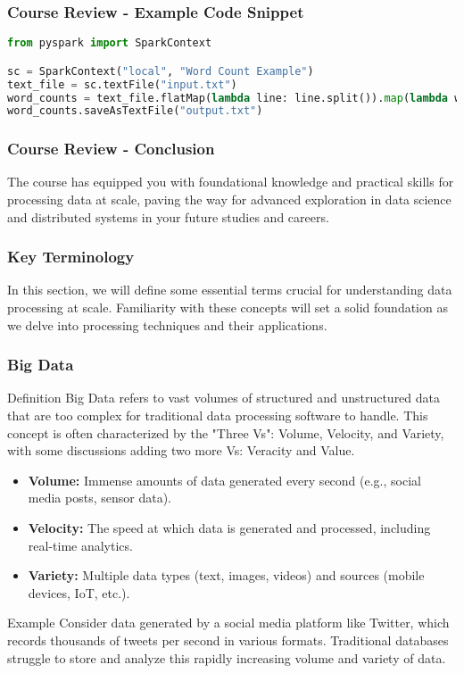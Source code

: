 \documentclass[aspectratio=169]{beamer}
\begin{document}
\begin{frame}[fragile]
    \frametitle{Course Review - Example Code Snippet}
    \begin{lstlisting}[language=Python]
from pyspark import SparkContext

sc = SparkContext("local", "Word Count Example")
text_file = sc.textFile("input.txt")
word_counts = text_file.flatMap(lambda line: line.split()).map(lambda word: (word, 1)).reduceByKey(lambda a, b: a + b)
word_counts.saveAsTextFile("output.txt")
    \end{lstlisting}
\end{frame}

\begin{frame}[fragile]
    \frametitle{Course Review - Conclusion}
    The course has equipped you with foundational knowledge and practical skills for processing data at scale, paving the way for advanced exploration in data science and distributed systems in your future studies and careers.
\end{frame}

\begin{frame}
    \frametitle{Key Terminology}
    In this section, we will define some essential terms crucial for understanding data processing at scale. 
    Familiarity with these concepts will set a solid foundation as we delve into processing techniques and their applications.
\end{frame}

\begin{frame}
    \frametitle{Big Data}
    \begin{block}{Definition}
        Big Data refers to vast volumes of structured and unstructured data that are too complex for traditional data processing software to handle.
        This concept is often characterized by the "Three Vs": Volume, Velocity, and Variety, with some discussions adding two more Vs: Veracity and Value.
    \end{block}
    
    \begin{itemize}
        \item \textbf{Volume:} Immense amounts of data generated every second (e.g., social media posts, sensor data).
        \item \textbf{Velocity:} The speed at which data is generated and processed, including real-time analytics.
        \item \textbf{Variety:} Multiple data types (text, images, videos) and sources (mobile devices, IoT, etc.).
    \end{itemize}
    
    \begin{block}{Example}
        Consider data generated by a social media platform like Twitter, which records thousands of tweets per second in various formats. Traditional databases struggle to store and analyze this rapidly increasing volume and variety of data.
    \end{block}
\end{frame}
\end{document}
